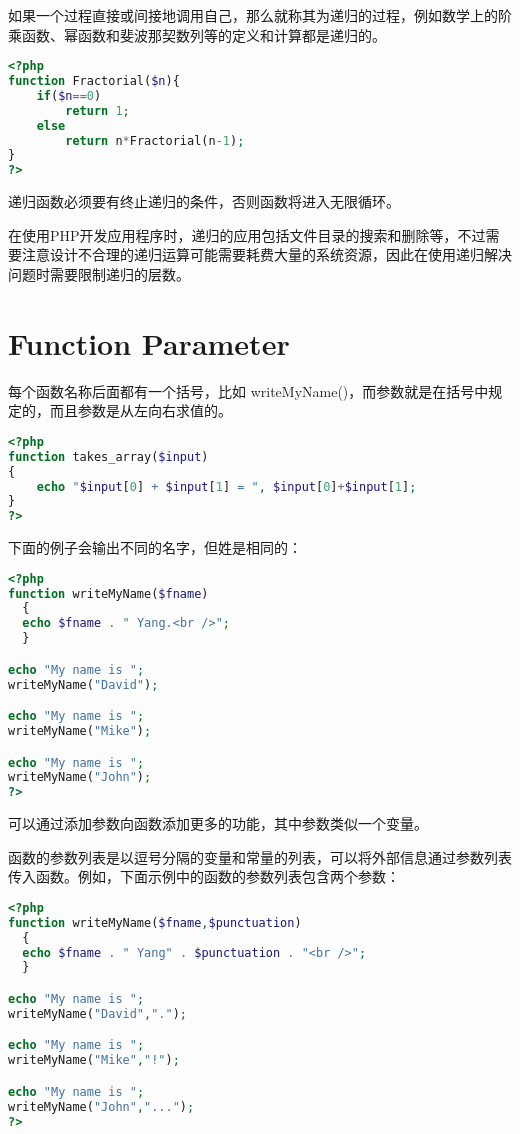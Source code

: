 如果一个过程直接或间接地调用自己，那么就称其为递归的过程，例如数学上的阶乘函数、幂函数和斐波那契数列等的定义和计算都是递归的。


\begin{lstlisting}[language=PHP]
<?php
function Fractorial($n){
	if($n==0)
		return 1;
	else
		return n*Fractorial(n-1);
}
?>
\end{lstlisting}

递归函数必须要有终止递归的条件，否则函数将进入无限循环。

在使用PHP开发应用程序时，递归的应用包括文件目录的搜索和删除等，不过需要注意设计不合理的递归运算可能需要耗费大量的系统资源，因此在使用递归解决问题时需要限制递归的层数。


\section{Function Parameter}

每个函数名称后面都有一个括号，比如 writeMyName()，而参数就是在括号中规定的，而且参数是从左向右求值的。

\begin{lstlisting}[language=PHP]
<?php
function takes_array($input)
{
    echo "$input[0] + $input[1] = ", $input[0]+$input[1];
}
?>
\end{lstlisting}

下面的例子会输出不同的名字，但姓是相同的：


\begin{lstlisting}[language=PHP]
<?php
function writeMyName($fname)
  {
  echo $fname . " Yang.<br />";
  }

echo "My name is ";
writeMyName("David");

echo "My name is ";
writeMyName("Mike");

echo "My name is ";
writeMyName("John");
?>
\end{lstlisting}

可以通过添加参数向函数添加更多的功能，其中参数类似一个变量。

函数的参数列表是以逗号分隔的变量和常量的列表，可以将外部信息通过参数列表传入函数。例如，下面示例中的函数的参数列表包含两个参数：

\begin{lstlisting}[language=PHP]
<?php
function writeMyName($fname,$punctuation)
  {
  echo $fname . " Yang" . $punctuation . "<br />";
  }

echo "My name is ";
writeMyName("David",".");

echo "My name is ";
writeMyName("Mike","!");

echo "My name is ";
writeMyName("John","...");
?>
\end{lstlisting}

